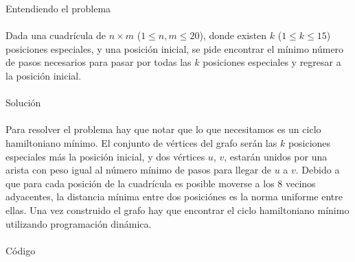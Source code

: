 \documentclass[12pt]{article}
\begin{document}
\textrm{\large Entendiendo el problema}\\
\\Dada una cuadrícula de $n \times m$ ($1 \leq n, m \leq 20$), donde existen $k$ ($1 \leq k \leq 15$) posiciones especiales, y una posición inicial, se pide encontrar el mínimo número de pasos necesarios para pasar por todas las $k$ posiciones especiales y regresar a la posición inicial.\\
\\
\textrm{\large Solución}\\
\\Para resolver el problema hay que notar que lo que necesitamos es un ciclo hamiltoniano mínimo. El conjunto de vértices del grafo serán las $k$ posiciones especiales más la posición inicial, y dos vértices $u$, $v$, estarán unidos por una arista con peso igual al número mínimo de pasos para llegar de $u$ a $v$. Debido a que para cada posición de la cuadrícula es posible moverse a los 8 vecinos adyacentes, la distancia mínima entre dos posiciónes es la norma uniforme entre ellas. Una vez construido el grafo hay que encontrar el ciclo hamiltoniano mínimo utilizando programación dinámica.\\
\\
\textrm{\large Código}\\
\end{document}
